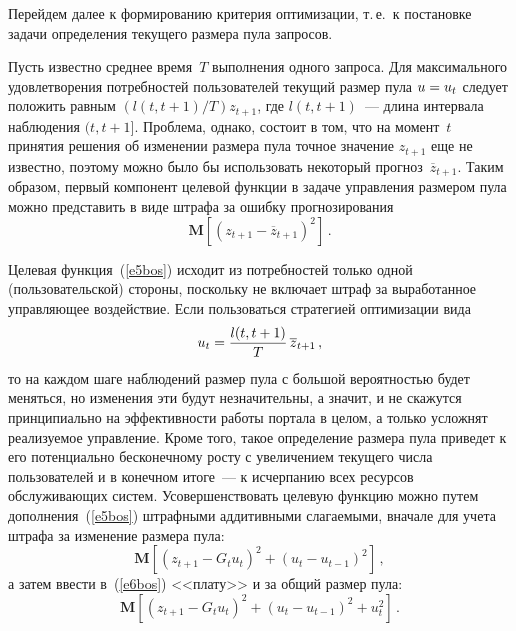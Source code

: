 \begin{multicols}{2}
  Перейдем далее к формированию критерия оптимизации, т.\,е.\ к постановке задачи 
определения текущего размера пула запросов.
  
  Пусть известно среднее время~$T$ выполнения одного запроса. Для максимального 
удовлетворения потребностей пользователей текущий размер пула $u\hm=u_t$ следует 
положить равным $(l(t,t+1)/T) z_{t+1}$, где $l(t,t+1)$~--- длина интервала наблюдения 
$(t,t+1]$. Проблема, однако, состоит в том, что на момент~$t$ принятия решения об 
изменении размера пула точное значение $z_{t+1}$ еще не известно, поэтому можно было 
бы использовать некоторый прогноз~$\overline{z}_{t+1}$. Таким образом, первый 
компонент целевой функции в задаче управления размером пула можно представить в виде 
штрафа за ошибку прогнозирования
  \begin{equation}
  \mathbf{M}\left[ \left( z_{t+1}-\overline{z}_{t+1}\right)^2\right]\,.
  \label{e5bos}
  \end{equation}


  Целевая функция~(\ref{e5bos}) исходит из потребностей только одной 
(пользовательской) стороны, поскольку не включает штраф за выработанное управ\-ля\-ющее 
воздействие. Если пользоваться стратегией оптимизации вида 
\begin{equation}
u_t=\displaystyle\frac{\displaystyle l(t,t+1)\mathstrut}{\displaystyle T\mathstrut}\,\overline{z}_{t+1}\,,
\label{e6-1bos}
\end{equation}
то на каждом шаге наблюдений размер пула с 
большой вероятностью будет меняться, но изменения эти будут незначительны, а значит, и 
не скажутся принципиально на эффективности работы портала в целом, а только усложнят 
реализуемое управление. Кроме того, такое определение размера пула приведет к его 
потенциально бесконечному росту с увеличением текущего числа пользователей и в 
конечном итоге~--- к исчерпанию всех ресурсов обслуживающих систем. 
Усовершенствовать целевую функцию можно путем дополнения~(\ref{e5bos}) штрафными 
аддитивными слагаемыми, вначале для учета штрафа за изменение размера пула:
  \begin{equation}
  \mathbf{M}\left[\left( z_{t+1}-G_t u_t\right)^2+\left( u_t-u_{t-1}\right)^2\right]\,,
  \label{e6bos}
  \end{equation}
а затем ввести в~(\ref{e6bos}) <<плату>> и за общий размер пула:
\begin{equation}
\mathbf{M}\left[\left( z_{t+1}-G_t u_t\right)^2+\left( u_t-u_{t-1}\right)^2+u_t^2\right]\,.
\label{e7bos}
\end{equation}



\end{multicols}
